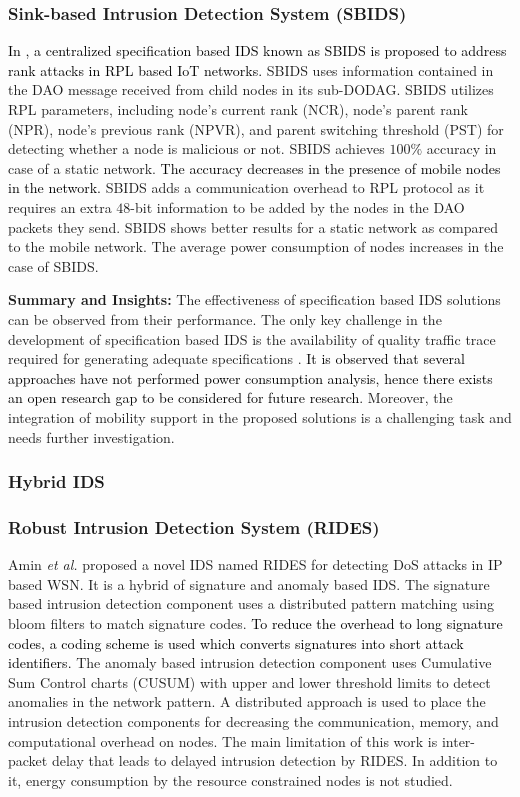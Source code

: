 \documentclass[10pt,journal,sort & compress]{IEEEtran}
\begin{document}
\subsubsection*{Sink-based Intrusion Detection System (SBIDS)}
\textcolor{black}{In \cite{shafique2018detection}, a centralized specification based IDS known as SBIDS is proposed to address rank attacks in RPL based IoT networks.} SBIDS uses information contained in the DAO message received from child nodes in its sub-DODAG. SBIDS utilizes RPL parameters, including node's current rank (NCR), node's parent rank (NPR), node's previous rank (NPVR), and parent switching threshold (PST) for detecting whether a node is malicious or not. SBIDS achieves $ 100\% $ accuracy in case of a static network. \textcolor{black}{The accuracy decreases in the presence of mobile nodes in the network.} SBIDS adds a communication overhead to RPL protocol as it requires an extra $ 48 $-bit information to be added by the nodes in the DAO packets they send. SBIDS shows better results for a static network as compared to the mobile network. The average power consumption of nodes increases in the case of SBIDS.  


\textbf{Summary and Insights:}  The effectiveness of specification based IDS solutions can be observed from their performance. The only key challenge in the development of specification based IDS is the availability of quality traffic trace required for generating adequate specifications \cite{Le2016}. \textcolor{black}{It is observed that several approaches \cite{lai2016detection, shafique2018detection} have not performed power consumption analysis, hence there exists an open research gap to be considered for future research}. Moreover, the integration of mobility support in the proposed solutions is a challenging task and needs further investigation.       


\subsubsection{Hybrid IDS} 

\subsubsection*{Robust Intrusion Detection System (RIDES)}
Amin \textit{et al.} \cite{RIDES} proposed a novel IDS named RIDES for detecting DoS attacks in IP based WSN. It is a hybrid of signature and anomaly based IDS. The signature based intrusion detection component uses a distributed pattern matching using bloom filters to match signature codes. \textcolor{black}{To reduce the overhead to long signature codes, a coding scheme is used which converts signatures into short attack identifiers.} The anomaly based intrusion detection component uses Cumulative Sum Control charts (CUSUM) with upper and lower threshold limits to detect anomalies in the network pattern. A distributed approach is used to place the intrusion detection components for decreasing the communication, memory, and computational overhead on nodes. The main limitation of this work is inter-packet delay that leads to delayed intrusion detection by RIDES. In addition to it, energy consumption by the resource constrained nodes is not studied.
\end{document}
